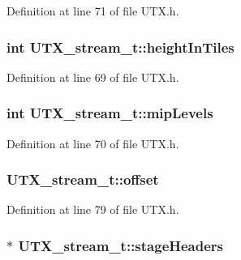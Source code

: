 Definition at line 71 of file UTX.h.\hypertarget{struct_u_t_x__stream__t_47d53e19719ffa239810e1b50eede36a}{
\subsubsection[{heightInTiles}]{\setlength{\rightskip}{0pt plus 5cm}int {\bf UTX\_\-stream\_\-t::heightInTiles}}}
\label{struct_u_t_x__stream__t_47d53e19719ffa239810e1b50eede36a}




Definition at line 69 of file UTX.h.\hypertarget{struct_u_t_x__stream__t_f18124ad6493ddd0301ec2f10075e3ef}{
\subsubsection[{mipLevels}]{\setlength{\rightskip}{0pt plus 5cm}int {\bf UTX\_\-stream\_\-t::mipLevels}}}
\label{struct_u_t_x__stream__t_f18124ad6493ddd0301ec2f10075e3ef}




Definition at line 70 of file UTX.h.\hypertarget{struct_u_t_x__stream__t_8d542232a515837bd595f28f5a5fd062}{
\subsubsection[{offset}]{ {\bf UTX\_\-stream\_\-t::offset}}}
\label{struct_u_t_x__stream__t_8d542232a515837bd595f28f5a5fd062}




Definition at line 79 of file UTX.h.\hypertarget{struct_u_t_x__stream__t_4133cbb5face496735b8133aa580806c}{
\subsubsection[{stageHeaders}]{$\ast$ {\bf UTX\_\-stream\_\-t::stageHeaders}}}
\label{struct_u_t_x__stream__t_4133cbb5face496735b8133aa580806c}




